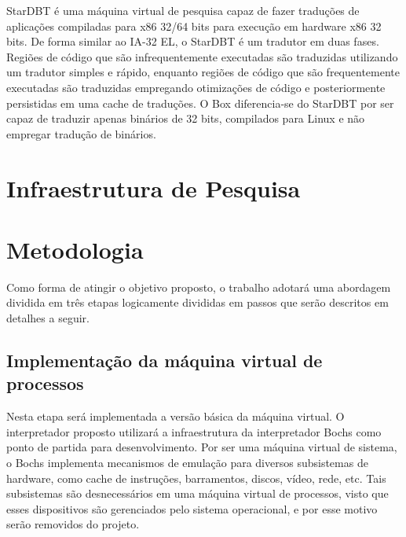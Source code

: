 \documentclass[11pt,twoside]{article}
\begin{document}
StarDBT \cite{Wang2007} é uma máquina virtual de pesquisa capaz de fazer traduções de aplicações compiladas para x86 32/64 bits para execução em hardware x86 32 bits.
De forma similar ao IA-32 EL, o StarDBT é um tradutor em duas fases. 
Regiões de código que são infrequentemente executadas são traduzidas utilizando um tradutor simples e rápido, enquanto regiões de código que são frequentemente executadas são traduzidas empregando otimizações de código e posteriormente persistidas em uma cache de traduções. 
O Box diferencia-se do StarDBT por ser capaz de traduzir apenas binários de 32 bits, compilados para Linux e não empregar tradução de binários.

\section{Infraestrutura de Pesquisa}
%

\section{Metodologia}
%

Como forma de atingir o objetivo proposto, o trabalho adotará uma abordagem dividida em três etapas logicamente divididas em passos que serão descritos em detalhes a seguir.

\subsection{Implementação da máquina virtual de processos}

Nesta etapa será implementada a versão básica da máquina virtual.
O interpretador proposto utilizará a infraestrutura da interpretador Bochs como ponto de partida para desenvolvimento. 
Por ser uma máquina virtual de sistema, o Bochs implementa mecanismos de emulação para diversos subsistemas de hardware, como cache de instruções, barramentos, discos, vídeo, rede, etc.
Tais subsistemas são desnecessários em uma máquina virtual de processos, visto que esses dispositivos são gerenciados pelo sistema operacional, e por esse motivo serão removidos do projeto.
\end{document}
